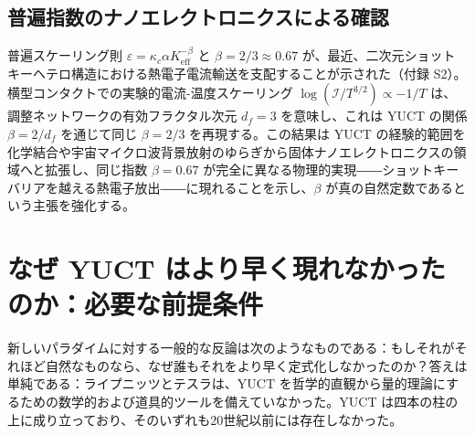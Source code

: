 \documentclass[12pt,a4paper]{article}
\begin{document}
	\subsection{普遍指数のナノエレクトロニクスによる確認}
	
	普遍スケーリング則 \(\varepsilon = \kappa_c \alpha K_{\mathrm{eff}}^{-\beta}\) と \(\beta = 2/3 \approx 0.67\) が、最近、二次元ショットキーヘテロ構造における熱電子電流輸送を支配することが示された（付録 S2）。横型コンタクトでの実験的電流-温度スケーリング \(\log(\mathcal{I}/T^{3/2}) \propto -1/T\) は、調整ネットワークの有効フラクタル次元 \(d_f = 3\) を意味し、これは YUCT の関係 \(\beta = 2/d_f\) を通じて同じ \(\beta = 2/3\) を再現する。この結果は YUCT の経験的範囲を化学結合や宇宙マイクロ波背景放射のゆらぎから固体ナノエレクトロニクスの領域へと拡張し、同じ指数 \(\beta = 0.67\) が完全に異なる物理的実現――ショットキーバリアを越える熱電子放出――に現れることを示し、\(\beta\) が真の自然定数であるという主張を強化する。
	
	\section{なぜ YUCT はより早く現れなかったのか：必要な前提条件}
	\label{sec:prerequisites}
	
	新しいパラダイムに対する一般的な反論は次のようなものである：もしそれがそれほど自然なものなら、なぜ誰もそれをより早く定式化しなかったのか？答えは単純である：ライプニッツとテスラは、YUCT を哲学的直観から量的理論にするための数学的および道具的ツールを備えていなかった。YUCT は四本の柱の上に成り立っており、そのいずれも20世紀以前には存在しなかった。
	
\end{document}
